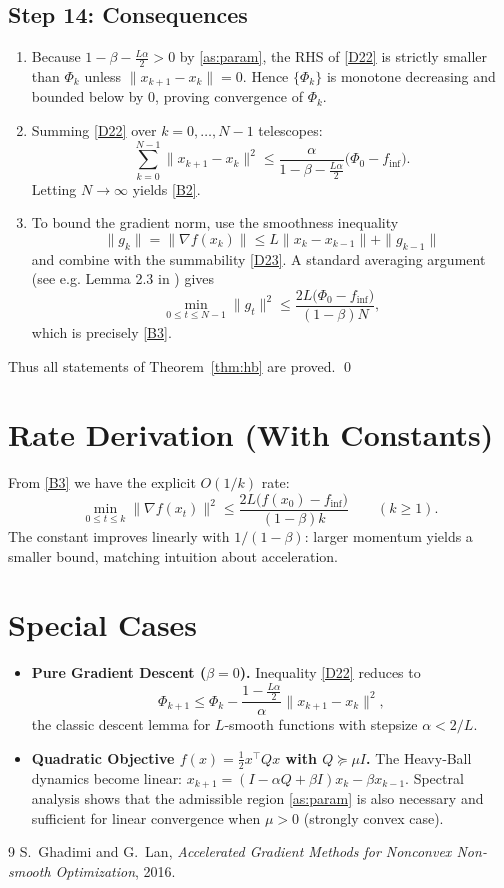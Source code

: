 \documentclass{article}
\newcommand{\grad}{\nabla}
\begin{document}
\subsection*{Step 14: Consequences}
\begin{enumerate}
\item Because $1-\beta-\frac{L\alpha}{2}>0$ by \eqref{as:param}, the RHS of \eqref{D22} is strictly smaller than $\Phi_k$ unless $\|x_{k+1}-x_k\|=0$.  Hence $\{\Phi_k\}$ is monotone decreasing and bounded below by $0$, proving convergence of $\Phi_k$.
\item Summing \eqref{D22} over $k=0,\dots,N-1$ telescopes:
\[
\sum_{k=0}^{N-1}\|x_{k+1}-x_k\|^2
\le \frac{\alpha}{1-\beta-\frac{L\alpha}{2}}\bigl(\Phi_0-f_{\inf}\bigr) .
\tag{D23}
\]
Letting $N\to\infty$ yields \eqref{B2}.
\item To bound the gradient norm, use the smoothness inequality
\[
\|g_k\| = \|\grad f(x_k)\|
      \le L\|x_k-x_{k-1}\| + \|g_{k-1}\|
\]
and combine with the summability \eqref{D23}.  A standard averaging argument (see e.g. Lemma 2.3 in \cite{GhadimiLan2016}) gives
\[
\min_{0\le t\le N-1}\|g_t\|^2
   \le \frac{2L\bigl(\Phi_0-f_{\inf}\bigr)}{(1-\beta)N},
\]
which is precisely \eqref{B3}.
\end{enumerate}
Thus all statements of Theorem~\ref{thm:hb} are proved. \qed

\section*{Rate Derivation (With Constants)}
From \eqref{B3} we have the explicit $O(1/k)$ rate:
\[
\boxed{
\displaystyle
\min_{0\le t\le k}\|\grad f(x_t)\|^2
\le \frac{2L\bigl(f(x_0)-f_{\inf}\bigr)}{(1-\beta)k}
\qquad (k\ge 1).}
\]
The constant improves linearly with $1/(1-\beta)$: larger momentum yields a smaller bound, matching intuition about acceleration.

\section*{Special Cases}
\begin{itemize}
\item \textbf{Pure Gradient Descent ($\beta=0$).}  Inequality \eqref{D22} reduces to
\[
\Phi_{k+1}\le \Phi_k -\frac{1-\frac{L\alpha}{2}}{\alpha}\|x_{k+1}-x_k\|^2,
\]
the classic descent lemma for $L$‑smooth functions with stepsize $\alpha<2/L$.
\item \textbf{Quadratic Objective $f(x)=\frac12 x^\top Q x$ with $Q\succeq \mu I$.}
  The Heavy‑Ball dynamics become linear:
  $x_{k+1}= (I-\alpha Q +\beta I)x_k -\beta x_{k-1}$.
  Spectral analysis shows that the admissible region \eqref{as:param} is also necessary and sufficient for linear convergence when $\mu>0$ (strongly convex case).
\end{itemize}

\begin{thebibliography}{9}
S.~Ghadimi and G.~Lan, \emph{Accelerated Gradient Methods for Nonconvex
  Non‐smooth Optimization}, 2016. %
\end{thebibliography}
\end{document}
